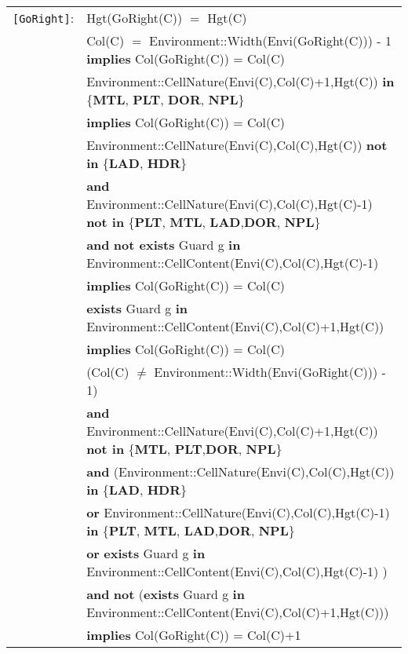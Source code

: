 \documentclass[7pt]{article}
\begin{document}
\begin{tabular}{rl}
\texttt{[GoRight]}: & \textrm{Hgt(GoRight(C))} $=$ \textrm{Hgt(C)} \\
& \textrm{Col(C)} $=$ Environment::Width(Envi(GoRight(C))) - 1 \textbf{implies} \textrm{Col(GoRight(C))} = \textrm{Col(C)} \\
& \textrm{Environment::CellNature(Envi(C),Col(C)+1,Hgt(C))} \textbf{in} \{\textbf{MTL}, \textbf{PLT}, \textbf{DOR}, \textbf{NPL}\}\\
& \quad \textbf{implies} \textrm{Col(GoRight(C))} = \textrm{Col(C)} \\
& \textrm{Environment::CellNature(Envi(C),Col(C),Hgt(C))} \textbf{not in} \{\textbf{LAD}, \textbf{HDR}\}
\\ & \quad\quad \textbf{and} \textrm{Environment::CellNature(Envi(C),Col(C),Hgt(C)-1)} \textbf{not in} \{\textbf{PLT}, \textbf{MTL}, \textbf{LAD},\textbf{DOR}, \textbf{NPL}\} \\
& \quad\quad \textbf{and} \textbf{not exists} \textrm{Guard} g \textbf{in} \textrm{Environment::CellContent(Envi(C),Col(C),Hgt(C)-1)} \\
& \quad\quad \textbf{implies} \textrm{Col(GoRight(C))} = \textrm{Col(C)} \\
& \textbf{exists} \textrm{Guard} g \textbf{in} \textrm{Environment::CellContent(Envi(C),Col(C)+1,Hgt(C))} \\ & \quad\quad \textbf{implies} \textrm{Col(GoRight(C))} = \textrm{Col(C)} \\

& (\textrm{Col(C)} $\neq$  Environment::Width(Envi(GoRight(C))) - 1) \\
& \quad \textbf{and} \textrm{Environment::CellNature(Envi(C),Col(C)+1,Hgt(C))} \textbf{not in} \{\textbf{MTL}, \textbf{PLT},\textbf{DOR}, \textbf{NPL}\} \\
& \quad\quad \textbf{and} (\textrm{Environment::CellNature(Envi(C),Col(C),Hgt(C))} \textbf{in} \{\textbf{LAD}, \textbf{HDR}\} \\
& \quad\quad\quad\quad \textbf{or} \textrm{Environment::CellNature(Envi(C),Col(C),Hgt(C)-1)} \textbf{in} \{\textbf{PLT}, \textbf{MTL}, \textbf{LAD},\textbf{DOR}, \textbf{NPL}\} \\
& \quad\quad\quad\quad \textbf{or} \textbf{exists} \textrm{Guard} g \textbf{in} \textrm{Environment::CellContent(Envi(C),Col(C),Hgt(C)-1)} ) \\
& \quad\quad \textbf{and} \textbf{not} (\textbf{exists} \textrm{Guard} g \textbf{in} \textrm{Environment::CellContent(Envi(C),Col(C)+1,Hgt(C))}) \\
& \quad\quad \textbf{implies} \textrm{Col(GoRight(C))} = \textrm{Col(C)}+1 \\


\end{tabular}
\end{document}

